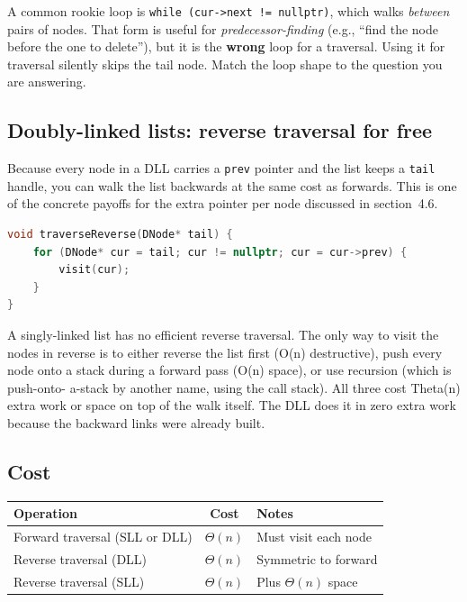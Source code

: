 \documentclass[11pt]{article}
\begin{document}
\begin{warnbox}
A common rookie loop is \texttt{while (cur->next != nullptr)},
which walks \emph{between} pairs of nodes. That form is useful for
\emph{predecessor-finding} (e.g., ``find the node before the one
to delete''), but it is the \textbf{wrong} loop for a traversal.
Using it for traversal silently skips the tail node. Match the
loop shape to the question you are answering.
\end{warnbox}

\subsection*{Doubly-linked lists: reverse traversal for free}

Because every node in a DLL carries a \texttt{prev} pointer and the
list keeps a \texttt{tail} handle, you can walk the list backwards
at the same cost as forwards. This is one of the concrete payoffs
for the extra pointer per node discussed in section~4.6.

\begin{examplebox}
\begin{lstlisting}[language=C++,basicstyle=\ttfamily\small,frame=single]
void traverseReverse(DNode* tail) {
    for (DNode* cur = tail; cur != nullptr; cur = cur->prev) {
        visit(cur);
    }
}
\end{lstlisting}
\end{examplebox}

A singly-linked list has no efficient reverse traversal. The only
way to visit the nodes in reverse is to either reverse the list
first (O(n) destructive), push every node onto a stack during a
forward pass (O(n) space), or use recursion (which is push-onto-
a-stack by another name, using the call stack). All three cost
Theta(n) extra work or space on top of the walk itself. The DLL
does it in zero extra work because the backward links were already
built.

\subsection*{Cost}

\begin{center}
\begin{tabular}{|l|c|l|}
\hline
\textbf{Operation} & \textbf{Cost} & \textbf{Notes} \\
\hline
Forward traversal (SLL or DLL) & $\Theta(n)$ & Must visit each node \\
Reverse traversal (DLL)        & $\Theta(n)$ & Symmetric to forward \\
Reverse traversal (SLL)        & $\Theta(n)$ & Plus $\Theta(n)$ space \\
\hline
\end{tabular}
\end{center}
\end{document}
